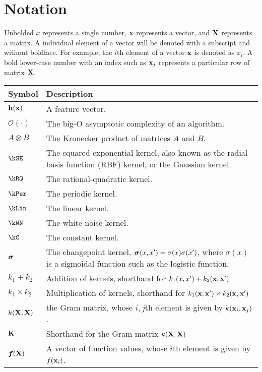 
\inbpdocument

\chapter*{Notation}
\label{ch:notation}


Unbolded $x$ represents a single number, ${\bf{x}}$ represents a vector, and $\mathbf{X}$ represents a matrix.
A individual element of a vector will be denoted with a subscript and without boldface.
For example, the $i$th element of a vector ${\bf{x}}$ is denoted as $x_i$.
A bold lower-case number with an index such as ${\bf{x}}_j$ represents a particular row of matrix $\mathbf{X}$.

\vspace{1cm}

\begin{tabular}{lm{12cm}}
Symbol \quad     & Description \\
\hline
${\bf{h}}({\bf{x}})$       & A feature vector. \\
$\mathcal{O}(\cdot)$ & The big-O asymptotic complexity of an algorithm. \\
$A \otimes B$ & The Kronecker product of matrices $A$ and $B$. \\
$\kSE$ & The squared-exponential kernel, also known as the radial-basis function (RBF) kernel, or the Gaussian kernel. \\
$\kRQ$ & The rational-quadratic kernel. \\
$\kPer$ & The periodic kernel. \\
$\kLin$ & The linear kernel. \\
$\kWN$ & The white-noise kernel. \\
$\kC$ & The constant kernel. \\
$\boldsymbol{\sigma}$ & The changepoint kernel, $\boldsymbol{\sigma}(x, x') = \sigma(x) \sigma(x')$, where $\sigma(x)$ is a sigmoidal function such as the logistic function. \\
$k_1 + k_2$ & Addition of kernels, shorthand for $k_1(x,x') + k_2({\bf{x}}, {\bf{x}}')$ \\
$k_1 \times k_2$& Multiplication of kernels, shorthand for $k_1({\bf{x}}, {\bf{x}}') \times k_2({\bf{x}}, {\bf{x}}')$ \\
$k(\mathbf{X}, \mathbf{X})$ & the Gram matrix, whose $i,j$th element is given by $k({\bf{x}}_i, {\bf{x}}_j)$. \\
$\mathbf{K}$ & Shorthand for the Gram matrix $k(\mathbf{X}, \mathbf{X})$ \\
$\boldsymbol{f}(\mathbf{X})$ & A vector of function values, whose $i$th element is given by $f({\bf{x}}_i)$.
\end{tabular}



\outbpdocument{
}


